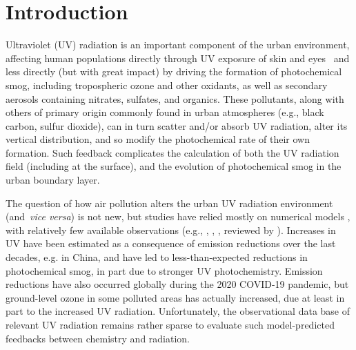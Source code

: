 \documentclass[journal=jacsat,manuscript=article]{achemso}
\begin{document}
\section{Introduction}

Ultraviolet (UV) radiation is an important component of the urban
environment, affecting human populations directly through UV exposure of
skin and eyes~\citep{Taylor_1988,Varotsos_1997,Lucas_2019}
and less directly (but with great
impact) by driving the formation of photochemical smog, including
tropospheric ozone and other oxidants, as well as secondary aerosols
containing nitrates, sulfates, and
organics.\citep{LEIGHTON_1961,Seinfeld_1998,Finlayson_Pitts_2000}
These pollutants, along with others of primary origin commonly found in urban
atmospheres (e.g., black carbon, sulfur dioxide), can in turn scatter
and/or absorb UV radiation, alter its vertical distribution, and so
modify the photochemical rate of their own formation. Such feedback
complicates the calculation of both the UV radiation field (including at
the surface), and the evolution of photochemical smog in the urban
boundary layer.

The question of how air pollution alters the urban UV radiation environment
(and~\emph{vice versa}) is not new, but studies have relied mostly on
numerical models \cite{Liu_1991,Sabziparvar_1998,Madronich_2011},
with relatively few available observations (e.g.,
\citet{McKenzie_2008}, \citet{Panicker_2009}, \citet{Palancar_2013},
reviewed by \citet{Bais_2015}). Increases in UV have been estimated as a consequence
of emission reductions over the last decades, e.g. in China,\citep{Hollaway_2019,Li_2018,Wang_2020}
and have led to less-than-expected
reductions in photochemical smog, in part due to stronger UV
photochemistry.\citep{Wang_2019,Gao_2020,Ma_2021}
Emission reductions have also occurred
globally during the 2020 COVID-19 pandemic,\citep{Bauwens_2020,Venter_2020}
but ground-level ozone in some polluted areas has actually
increased,\citep{Shi_2020,Le_2020} due at least in part to the increased UV
radiation. Unfortunately, the observational data base of relevant UV
radiation remains rather sparse to evaluate such model-predicted feedbacks between chemistry and radiation.~~
\end{document}
